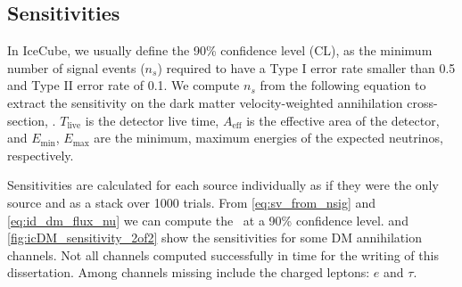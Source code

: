 \subsection{Sensitivities} \label{sec:icDM_sensitivity}

In IceCube, we usually define the 90\% confidence level (CL), as the minimum number of signal events ($n_s$) required to have a Type I error rate smaller than 0.5 and Type II error rate of 0.1.
We compute  $n_s$ from the following equation
\svFromNSig
to extract the sensitivity on the dark matter velocity-weighted annihilation cross-section, \sv.
$T_\mathrm{live} $ is the detector live time, $ A_\mathrm{eff} $ is the effective area of the detector, and $ E_\mathrm{min} $, $ E_\mathrm{max} $ are the minimum, maximum energies of the expected neutrinos, respectively.

Sensitivities are calculated for each source individually as if they were the only source and as a stack over 1000 trials.
From \cref{eq:sv_from_nsig} and \cref{eq:id_dm_flux_nu} we can compute the \sv~at a 90\% confidence level.
 and \cref{fig:icDM_sensitivity_2of2} show the sensitivities for some DM annihilation channels.
Not all channels computed successfully in time for the writing of this dissertation.
Among channels missing include the charged leptons: $e$ and $\tau$.

